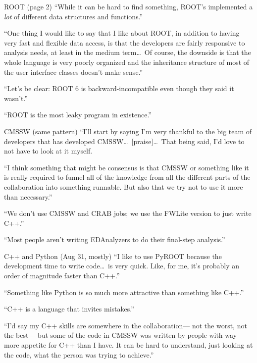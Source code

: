 \documentclass{beamer}
\begin{document}
\begin{frame}{ROOT (page 2)}
\vspace{0.5 cm}
\textcolor{aug29}{``While it can be hard to find something, ROOT's implemented a {\it lot} of different data structures and functions.''}

\vfill
\textcolor{aug29}{``One thing I would like to say that I like about ROOT, in addition to having very fast and flexible data access, is that the developers are fairly responsive to analysis needs, at least in the medium term\ldots\ Of course, the downside is that the whole language is very poorly organized and the inheritance structure of most of the user interface classes doesn't make sense.''}

\vfill
\textcolor{aug29}{``Let's be clear: ROOT 6 is backward-incompatible even though they said it wasn't.''}

\vfill
\textcolor{aug29}{``ROOT is the most leaky program in existence.''}
\end{frame}

\begin{frame}{CMSSW (same pattern)}
\vspace{0.5 cm}
\textcolor{aug31}{``I'll start by saying I'm very thankful to the big team of developers that has developed CMSSW\ldots\ [praise]\ldots\ That being said, I'd love to not have to look at it myself.}

\vfill
\textcolor{aug31}{``I think something that might be consensus is that CMSSW or something like it is really required to funnel all of the knowledge from all the different parts of the collaboration into something runnable. But also that we try not to use it more than necessary.''}

\vfill
\textcolor{aug29}{``We don't use CMSSW and CRAB jobs; we use the FWLite version to just write C++.''}

\vfill
\textcolor{aug29}{``Most people aren't writing EDAnalyzers to do their final-step analysis.''}
\end{frame}

\begin{frame}{C++ and Python (Aug 31, mostly)}
\vspace{0.5 cm}
\textcolor{aug31}{``I like to use PyROOT because the development time to write code\ldots\ is very quick. Like, for me, it's probably an order of magnitude faster than C++.''}

\vfill
\textcolor{aug31}{``Something like Python is so much more attractive than something like C++.''}

\vfill
\textcolor{aug31}{``C++ is a language that invites mistakes.''}

\vfill
\textcolor{aug31}{``I'd say my C++ skills are somewhere in the collaboration--- not the worst, not the best--- but some of the code in CMSSW was written by people with way more appetite for C++ than I have. It can be hard to understand, just looking at the code, what the person was trying to achieve.''}
\end{frame}
\end{document}
